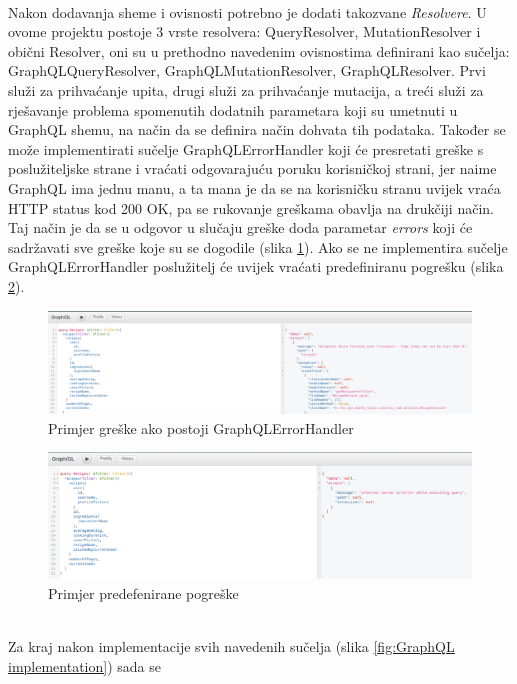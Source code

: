 \documentclass[times, utf8, zavrsni]{fer}
\begin{document}
\\
Nakon dodavanja sheme i ovisnosti potrebno je dodati takozvane \textit{Resolvere}. U ovome projektu postoje 3 vrste resolvera:
QueryResolver, MutationResolver i obični Resolver, oni su u prethodno navedenim ovisnostima definirani kao sučelja:
GraphQLQueryResolver, GraphQLMutationResolver, GraphQLResolver. Prvi služi za prihvaćanje upita, drugi služi za prihvaćanje
mutacija, a treći služi za rješavanje problema spomenutih dodatnih parametara koji su umetnuti u GraphQL shemu,
na način da se definira način dohvata tih podataka. Također se može implementirati sučelje GraphQLErrorHandler koji
će presretati greške s poslužiteljske strane i vraćati odgovarajuću poruku korisničkoj strani, jer naime GraphQL
ima jednu manu, a ta mana je da se na korisničku stranu uvijek vraća HTTP status kod 200 OK, pa se rukovanje greškama
obavlja na drukčiji način. Taj način je da se u odgovor u slučaju greške doda parametar \textit{errors} koji će sadržavati
sve greške koje su se dogodile (slika \ref{fig:Handled error}).
Ako se ne implementira sučelje GraphQLErrorHandler poslužitelj će uvijek vraćati predefiniranu pogrešku (slika \ref{fig:Default error}). \\
\begin{figure}[h]
      \includegraphics[width=\textwidth]{graphql_handled_error.png}
      \caption{Primjer greške ako postoji GraphQLErrorHandler}
      \label{fig:Handled error}
\end{figure}
\begin{figure}[h]
      \includegraphics[width=\textwidth]{graphql_default_error.png}
      \caption{Primjer predefenirane pogreške}
      \label{fig:Default error}
\end{figure}
\\
Za kraj nakon implementacije svih navedenih sučelja (slika \ref{fig:GraphQL implementation}) sada se
\end{document}
